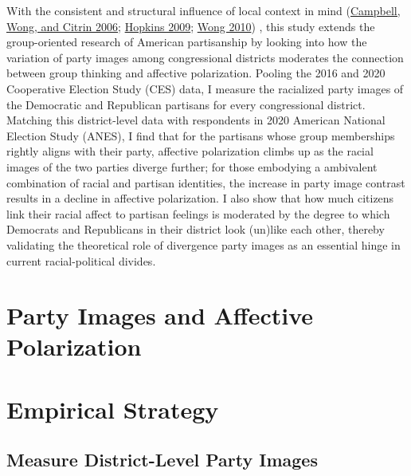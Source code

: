 \documentclass[
  12pt,
]{article}
\begin{document}
With the consistent and structural influence of local context in mind
(\protect\hyperlink{ref-campbell2006}{Campbell, Wong, and Citrin 2006};
\protect\hyperlink{ref-hopkins2009}{Hopkins 2009};
\protect\hyperlink{ref-wong2010}{Wong 2010}) , this study extends the
group-oriented research of American partisanship by looking into how the
variation of party images among congressional districts moderates the
connection between group thinking and affective polarization. Pooling
the 2016 and 2020 Cooperative Election Study (CES) data, I measure the
racialized party images of the Democratic and Republican partisans for
every congressional district. Matching this district-level data with
respondents in 2020 American National Election Study (ANES), I find that
for the partisans whose group memberships rightly aligns with their
party, affective polarization climbs up as the racial images of the two
parties diverge further; for those embodying a ambivalent combination of
racial and partisan identities, the increase in party image contrast
results in a decline in affective polarization. I also show that how
much citizens link their racial affect to partisan feelings is moderated
by the degree to which Democrats and Republicans in their district look
(un)like each other, thereby validating the theoretical role of
divergence party images as an essential hinge in current
racial-political divides.

\newpage

\hypertarget{party-images-and-affective-polarization}{%
\section{Party Images and Affective
Polarization}\label{party-images-and-affective-polarization}}

\hypertarget{empirical-strategy}{%
\section{Empirical Strategy}\label{empirical-strategy}}

\hypertarget{measure-district-level-party-images}{%
\subsection{Measure District-Level Party
Images}\label{measure-district-level-party-images}}
\end{document}
